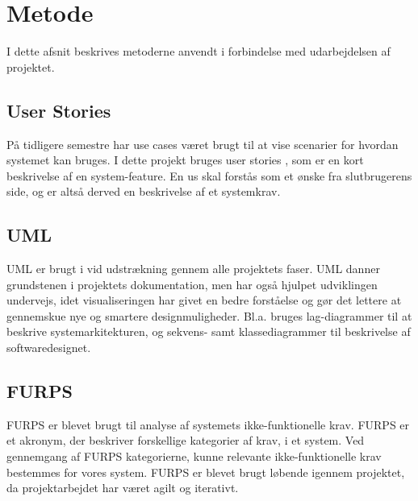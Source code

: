 \chapter{Metode}
I dette afsnit beskrives metoderne anvendt i forbindelse med udarbejdelsen af projektet.

\section{User Stories}
På tidligere semestre har use cases været brugt til at vise scenarier for hvordan systemet kan bruges. I dette projekt bruges user stories \cite{margaretrouse2015}, som er en kort beskrivelse af en system-feature. En \gls{us} skal forstås som et ønske fra slutbrugerens side, og er altså derved en beskrivelse af et systemkrav.

\section{UML}
UML er brugt i vid udstrækning gennem alle projektets faser. UML danner grundstenen i projektets dokumentation, men har også hjulpet udviklingen undervejs, idet visualiseringen har givet en bedre forståelse og gør det lettere at gennemskue nye og smartere designmuligheder. Bl.a. bruges lag-diagrammer til at beskrive systemarkitekturen, og sekvens- samt klassediagrammer til beskrivelse af softwaredesignet.

\section{FURPS}
FURPS er blevet brugt til analyse af systemets ikke-funktionelle krav. FURPS er et akronym, der beskriver forskellige kategorier af krav, i et system. Ved gennemgang af FURPS kategorierne, kunne relevante ikke-funktionelle krav bestemmes for vores system. FURPS er blevet brugt løbende igennem projektet, da projektarbejdet har været agilt og iterativt.